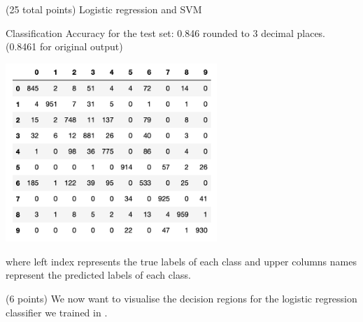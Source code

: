 \documentclass[12pt]{article}
\begin{document}
\begin{question}{(25 total points) Logistic regression and SVM}
\begin{subquestion}
   

      \begin{answerbox}{30em}
         Classification Accuracy for the test set: 0.846 rounded to 3 decimal places.\\(0.8461 for original output)
         \begin{center}
         \includegraphics[width=0.6\textwidth]{svm.png}
         \end{center}
         where left index represents the true labels of each class and upper columns names represent the predicted labels of each class.
      \end{answerbox}
  


   \end{subquestion}
   \begin{subquestion}{(6 points)
       We now want to visualise the decision regions for the logistic
       regression classifier we trained in .
     } \label{Q2.3}


   


\end{subquestion}
\end{question}
\end{document}
